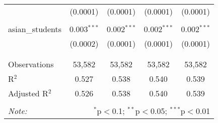 \begin{table}[!htbp]
\begin{tabular}{@{\extracolsep{-2pt}}lcccc}
  & (0.0001) & (0.0001) & (0.0001) & (0.0001) \\ 
  & & & & \\ 
 asian\_students & 0.003$^{***}$ & 0.002$^{***}$ & 0.002$^{***}$ & 0.002$^{***}$ \\ 
  & (0.0002) & (0.0001) & (0.0001) & (0.0001) \\ 
  & & & & \\ 
\hline \\[-1.8ex] 
Observations & 53,582 & 53,582 & 53,582 & 53,582 \\ 
R$^{2}$ & 0.527 & 0.538 & 0.540 & 0.539 \\ 
Adjusted R$^{2}$ & 0.526 & 0.538 & 0.540 & 0.539 \\ 
\hline 
\hline \\[-1.8ex] 
\textit{Note:}  & \multicolumn{4}{r}{$^{*}$p$<$0.1; $^{**}$p$<$0.05; $^{***}$p$<$0.01} \\ 
\end{tabular} 
\end{table} 
